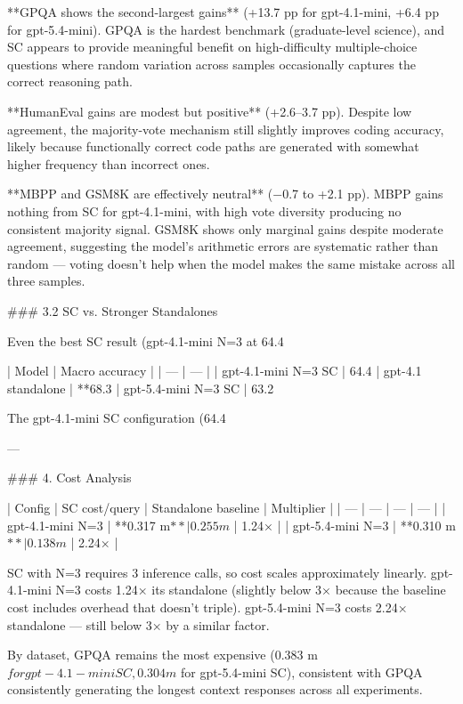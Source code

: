 **GPQA shows the second-largest gains** (+13.7 pp for gpt-4.1-mini, +6.4 pp for gpt-5.4-mini). GPQA is the hardest benchmark (graduate-level science), and SC appears to provide meaningful benefit on high-difficulty multiple-choice questions where random variation across samples occasionally captures the correct reasoning path.

**HumanEval gains are modest but positive** (+2.6–3.7 pp). Despite low agreement, the majority-vote mechanism still slightly improves coding accuracy, likely because functionally correct code paths are generated with somewhat higher frequency than incorrect ones.

**MBPP and GSM8K are effectively neutral** (−0.7 to +2.1 pp). MBPP gains nothing from SC for gpt-4.1-mini, with high vote diversity producing no consistent majority signal. GSM8K shows only marginal gains despite moderate agreement, suggesting the model's arithmetic errors are systematic rather than random — voting doesn't help when the model makes the same mistake across all three samples.

### 3.2 SC vs. Stronger Standalones

Even the best SC result (gpt-4.1-mini N=3 at 64.4%

| Model | Macro accuracy |
| --- | --- |
| gpt-4.1-mini N=3 SC | 64.4%
| gpt-4.1 standalone | **68.3%
| gpt-5.4-mini N=3 SC | 63.2%

The gpt-4.1-mini SC configuration (64.4%

---

### 4. Cost Analysis

| Config | SC cost/query | Standalone baseline | Multiplier |
| --- | --- | --- | --- |
| gpt-4.1-mini N=3 | **0.317 m$** | 0.255 m$ | 1.24× |
| gpt-5.4-mini N=3 | **0.310 m$** | 0.138 m$ | 2.24× |

SC with N=3 requires 3 inference calls, so cost scales approximately linearly. gpt-4.1-mini N=3 costs 1.24× its standalone (slightly below 3× because the baseline cost includes overhead that doesn't triple). gpt-5.4-mini N=3 costs 2.24× standalone — still below 3× by a similar factor.

By dataset, GPQA remains the most expensive (0.383 m$ for gpt-4.1-mini SC, 0.304 m$ for gpt-5.4-mini SC), consistent with GPQA consistently generating the longest context responses across all experiments.

